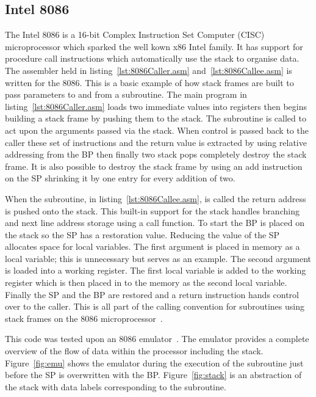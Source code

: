 \documentclass[12pt,a4paper]{article}
\begin{document}
\subsection{Intel 8086}
\label{8086}
The Intel 8086 is a 16-bit Complex Instruction Set Computer (CISC) microprocessor which sparked the well kown x86 Intel family.
It has support for procedure call instructions which automatically use the stack to organise data.
The assembler held in listing~\ref{lst:8086Caller.asm} and~\ref{lst:8086Callee.asm} is written for the 8086.
This is a basic example of how stack frames are built to pass parameters to and from a subroutine.
The main program in listing~\ref{lst:8086Caller.asm} loads two immediate values into registers then begins building a stack frame by pushing them to the stack.  
The subroutine is called to act upon the arguments passed via the stack.
When control is passed back to the caller these set of instructions and the return value is extracted by using relative addressing from the BP then finally two stack pops completely destroy the stack frame.
It is also possible to destroy the stack frame by using an add instruction on the SP shrinking it by one entry for every addition of two.





When the subroutine, in listing~\ref{lst:8086Callee.asm}, is called the return address is pushed onto the stack.
This built-in support for the stack handles branching and next line address storage using a call function.
To start the BP is placed on the stack so the SP has a restoration value.
Reducing the value of the SP allocates space for local variables.
The first argument is placed in memory as a local variable; this is unnecessary but serves as an example.
The second argument is loaded into a working register.
The first local variable is added to the working register which is then placed in to the memory as the second local variable.
Finally the SP and the BP are restored and a return instruction hands control over to the caller. 
This is all part of the calling convention for subroutines using stack frames on the 8086 microprocessor~\cite{8086call}.
 




This code was tested upon an 8086 emulator~\cite{emu8086}.
The emulator provides a complete overview of the flow of data within the processor including the stack. 
Figure~\ref{fig:emu} shows the emulator during the execution of the subroutine just before the SP is overwritten with the BP.
Figure~\ref{fig:stack} is an abstraction of the stack with data labels corresponding to the subroutine. 
\end{document}
